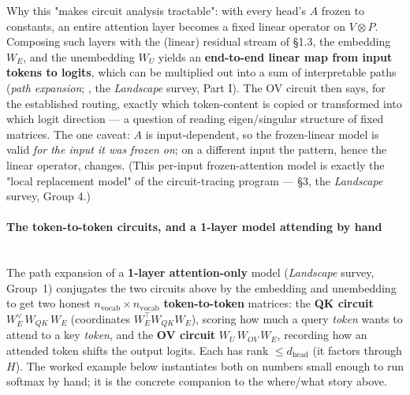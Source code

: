Why this "makes circuit analysis tractable": with every head's $A$ frozen to constants, an entire attention layer becomes a fixed linear operator on $V\otimes P$. Composing such layers with the (linear) residual stream of §1.3, the embedding $W_E$, and the unembedding $W_U$ yields an \textbf{end-to-end linear map from input tokens to logits}, which can be multiplied out into a sum of interpretable paths (\emph{path expansion}; \textcite{framework}, the \emph{Landscape} survey, Part I). The OV circuit then says, for the established routing, exactly which token-content is copied or transformed into which logit direction --- a question of reading eigen/singular structure of fixed matrices. The one caveat: $A$ is input-dependent, so the frozen-linear model is valid \emph{for the input it was frozen on}; on a different input the pattern, hence the linear operator, changes. (This per-input frozen-attention model is exactly the "local replacement model" of the circuit-tracing program --- §3, the \emph{Landscape} survey, Group 4.)


\paragraph*{The token-to-token circuits, and a 1-layer model attending by hand}\mbox{}\\

The path expansion of a \textbf{1-layer attention-only} model (\emph{Landscape} survey, Group~1) conjugates the two circuits above by the embedding and unembedding to get two honest $n_{\text{vocab}}\times n_{\text{vocab}}$ \textbf{token-to-token} matrices: the \textbf{QK circuit} $W_E^{\vee}\,W_{QK}\,W_E$ (coordinates $W_E^{\top}W_{QK}W_E$), scoring how much a query \emph{token} wants to attend to a key \emph{token}, and the \textbf{OV circuit} $W_U\,W_{OV}\,W_E$, recording how an attended token shifts the output logits. Each has rank $\le d_{\text{head}}$ (it factors through $H$). The worked example below instantiates both on numbers small enough to run softmax by hand; it is the concrete companion to the where/what story above.


